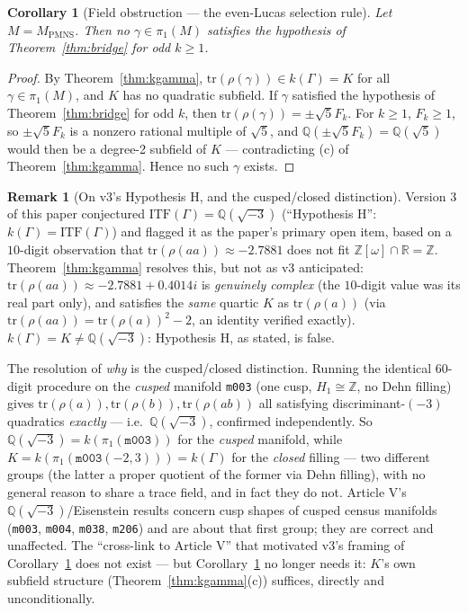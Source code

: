 \documentclass[12pt]{article}
\newtheorem{corollary}[theorem]{Corollary}
\theoremstyle{definition}
\newtheorem{remark}[theorem]{Remark}
\newcommand{\Z}{\mathbb{Z}}
\newcommand{\Q}{\mathbb{Q}}
\newcommand{\R}{\mathbb{R}}
\newcommand{\tr}{\mathrm{tr}}
\newcommand{\ITF}{\mathrm{ITF}}
\begin{document}
\begin{corollary}[Field obstruction --- the even-Lucas selection rule]
\label{cor:obstruction}
Let $M=M_{\mathrm{PMNS}}$. Then no $\gamma\in\pi_1(M)$ satisfies the
hypothesis of Theorem~\ref{thm:bridge} for odd $k\geq1$.
\end{corollary}

\begin{proof}
By Theorem~\ref{thm:kgamma}, $\tr(\rho(\gamma))\in k(\Gamma)=K$ for all
$\gamma\in\pi_1(M)$, and $K$ has no quadratic subfield. If $\gamma$
satisfied the hypothesis of Theorem~\ref{thm:bridge} for odd $k$, then
$\tr(\rho(\gamma))=\pm\sqrt5F_k$. For $k\geq1$, $F_k\geq1$, so
$\pm\sqrt5F_k$ is a nonzero rational multiple of $\sqrt5$, and
$\Q(\pm\sqrt5F_k)=\Q(\sqrt5)$ would then be a degree-2 subfield of $K$
--- contradicting (c) of Theorem~\ref{thm:kgamma}. Hence no such
$\gamma$ exists.
\end{proof}

\begin{remark}[On v3's Hypothesis H, and the cusped/closed distinction]
\label{rem:hypothesis}
Version 3 of this paper conjectured $\ITF(\Gamma)=\Q(\sqrt{-3})$
(``Hypothesis H'': $k(\Gamma)=\ITF(\Gamma)$) and flagged it as the
paper's primary open item, based on a $10$-digit observation that
$\tr(\rho(aa))\approx-2.7881$ does not fit $\Z[\omega]\cap\R=\Z$.
Theorem~\ref{thm:kgamma} resolves this, but not as v3 anticipated:
$\tr(\rho(aa))\approx-2.7881+0.4014i$ is \emph{genuinely complex} (the
$10$-digit value was its real part only), and satisfies the
\emph{same} quartic $K$ as $\tr(\rho(a))$ (via
$\tr(\rho(aa))=\tr(\rho(a))^2-2$, an identity verified exactly).
$k(\Gamma)=K\neq\Q(\sqrt{-3})$: Hypothesis H, as stated, is false.

The resolution of \emph{why} is the cusped/closed distinction. Running
the identical $60$-digit procedure on the \emph{cusped} manifold
\texttt{m003} (one cusp, $H_1\cong\Z$, no Dehn filling) gives
$\tr(\rho(a)),\tr(\rho(b)),\tr(\rho(ab))$ all satisfying
discriminant-$(-3)$ quadratics \emph{exactly} ---
i.e.\ $\Q(\sqrt{-3})$, confirmed independently. So
$\Q(\sqrt{-3})=k(\pi_1(\texttt{m003}))$ for the \emph{cusped}
manifold, while $K=k(\pi_1(\texttt{m003}(-2,3)))=k(\Gamma)$ for the
\emph{closed} filling --- two different groups (the latter a proper
quotient of the former via Dehn filling), with no general reason to
share a trace field, and in fact they do not. Article V's
$\Q(\sqrt{-3})$/Eisenstein results concern cusp shapes of cusped
census manifolds (\texttt{m003}, \texttt{m004}, \texttt{m038},
\texttt{m206}) and are about that first group; they are correct and
unaffected. The ``cross-link to Article V'' that motivated v3's framing
of Corollary~\ref{cor:obstruction} does not exist --- but
Corollary~\ref{cor:obstruction} no longer needs it: $K$'s own
subfield structure (Theorem~\ref{thm:kgamma}(c)) suffices, directly
and unconditionally.
\end{remark}
\end{document}
